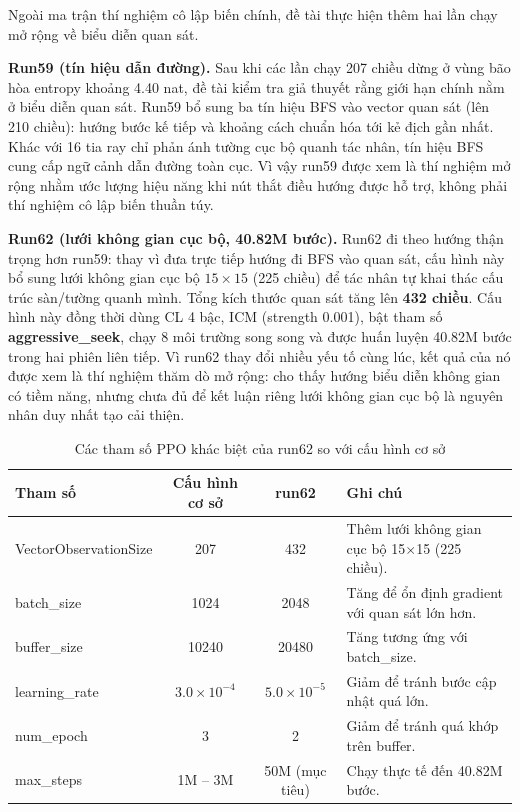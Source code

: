 Ngoài ma trận thí nghiệm cô lập biến chính, đề tài thực hiện thêm hai lần chạy mở rộng 
về biểu diễn quan sát.

\textbf{Run59 (tín hiệu dẫn đường).} Sau khi các lần chạy 207 chiều dừng ở vùng bão hòa entropy khoảng 4.40 nat, đề tài kiểm tra giả thuyết rằng giới hạn chính nằm ở biểu diễn quan sát. Run59 bổ sung ba tín hiệu BFS vào vector quan sát (lên 210 chiều): hướng bước kế tiếp và khoảng cách chuẩn hóa tới kẻ địch gần nhất. Khác với 16 tia ray chỉ phản ánh tường cục bộ quanh tác nhân, tín hiệu BFS cung cấp ngữ cảnh dẫn đường toàn cục. Vì vậy run59 được xem là thí nghiệm mở rộng nhằm ước lượng hiệu năng khi nút thắt điều hướng được hỗ trợ, không phải thí nghiệm cô lập biến thuần túy.

\textbf{Run62 (lưới không gian cục bộ, 40.82M bước).} Run62 đi theo hướng thận trọng hơn run59: thay vì đưa trực tiếp hướng đi BFS vào quan sát, cấu hình này bổ sung lưới không gian cục bộ $15\times15$ (225 chiều) để tác nhân tự khai thác cấu trúc sàn/tường quanh mình. Tổng kích thước quan sát tăng lên \textbf{432 chiều}. Cấu hình này đồng thời dùng CL 4 bậc, ICM (strength 0.001), bật tham số \textbf{aggressive\_seek}, chạy 8 môi trường song song và được huấn luyện 40.82M bước trong hai phiên liên tiếp. Vì run62 thay đổi nhiều yếu tố cùng lúc, kết quả của nó được xem là thí nghiệm thăm dò mở rộng: cho thấy hướng biểu diễn không gian có tiềm năng, nhưng chưa đủ để kết luận riêng lưới không gian cục bộ là nguyên nhân duy nhất tạo cải thiện.

\begin{table}[H]
    \centering
    \small
    \caption{Các tham số PPO khác biệt của run62 so với cấu hình cơ sở}
    \label{tab:run62_ppo_config}
    \begin{tabular}{|p{4cm}|c|c|p{5cm}|}
        \hline
        \textbf{Tham số} & \textbf{Cấu hình cơ sở} & \textbf{run62} & \textbf{Ghi chú} \\
        \hline
        VectorObservationSize & 207 & 432 & Thêm lưới không gian cục bộ 15$\times$15 (225 chiều). \\
        \hline
        batch\_size & 1024 & 2048 & Tăng để ổn định gradient với quan sát lớn hơn. \\
        \hline
        buffer\_size & 10240 & 20480 & Tăng tương ứng với batch\_size. \\
        \hline
        learning\_rate & $3.0 \times 10^{-4}$ & $5.0 \times 10^{-5}$ & Giảm để tránh bước cập nhật quá lớn. \\
        \hline
        num\_epoch & 3 & 2 & Giảm để tránh quá khớp trên buffer. \\
        \hline
        max\_steps & 1M -- 3M & 50M (mục tiêu) & Chạy thực tế đến 40.82M bước. \\
        \hline
    \end{tabular}
\end{table}
